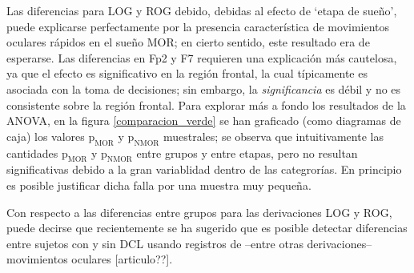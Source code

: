 \documentclass[12pt,letterpaper,draft]{book}
\begin{document}
Las diferencias para LOG y ROG debido, debidas al efecto de `etapa de sueño', puede explicarse perfectamente por la presencia característica de movimientos oculares rápidos en el sueño MOR; en cierto sentido, este resultado era de esperarse.
%
Las diferencias en Fp2 y F7 requieren una explicación más cautelosa, ya que el efecto es significativo en la región frontal, la cual típicamente es asociada con la toma de decisiones; sin embargo, la \textit{significancia} es débil y no es consistente sobre la región frontal.
%
Para explorar más a fondo los resultados de la ANOVA, en la figura \ref{comparacion_verde} se han graficado (como diagramas de caja) los valores $\text{p}_{\text{MOR}}$ y $\text{p}_{\text{NMOR}}$ muestrales; se observa que intuitivamente las cantidades $\text{p}_{\text{MOR}}$ y $\text{p}_{\text{NMOR}}$ entre grupos y entre etapas, pero no resultan significativas debido a la gran variablidad dentro de las categrorías.
%
En principio es posible justificar dicha falla por una muestra muy pequeña.

Con respecto a las diferencias entre grupos para las derivaciones LOG y ROG, puede decirse que recientemente se ha sugerido que es posible detectar diferencias entre sujetos con y sin DCL usando registros de --entre otras derivaciones-- movimientos oculares [articulo??].
\end{document}
